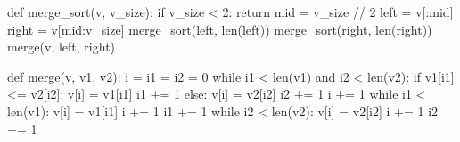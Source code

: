 \begin{unipdcode}[language=Python]
def merge_sort(v, v_size):
    if v_size < 2:
        return
    mid = v_size // 2
    left = v[:mid]
    right = v[mid:v_size]
    merge_sort(left, len(left))
    merge_sort(right, len(right))
    merge(v, left, right)


def merge(v, v1, v2):
    i = i1 = i2 = 0
    while i1 < len(v1) and i2 < len(v2):
        if v1[i1] <= v2[i2]:
            v[i] = v1[i1]
            i1 += 1
        else:
            v[i] = v2[i2]
            i2 += 1
        i += 1
    while i1 < len(v1):
        v[i] = v1[i1]
        i += 1
        i1 += 1
    while i2 < len(v2):
        v[i] = v2[i2]
        i += 1
        i2 += 1
\end{unipdcode}
